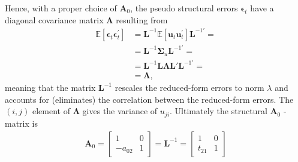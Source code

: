 \documentclass[a4paper,11pt,listof=nochaptergap,oneside,pointednumbers,bibtotoc,bigheadings,liststotoc,hidelinks]{scrbook}
\theoremstyle{mysatz}
\theoremstyle{mydefinition}
\theoremstyle{mytheorem}
\theoremstyle{mybemerkung}
\newcommand{\vect}[1]{\boldsymbol{\mathbf{#1}}}
\begin{document}
Hence, with a proper choice of $\vect{A}_0$, the pseudo structural errors $\vect{\epsilon}_t$ have a diagonal covariance matrix $\vect{\Lambda}$ resulting from 
\begin{equation} \label{eq:svar22}
\begin{split}
	\mathbb{E}[\vect{\epsilon}_t\vect{\epsilon}_t^'] & = \vect{L}^{-1} \mathbb{E}[\vect{u}_t\vect{u}_t^']\vect{L}^{-1'} = \\
										& = \vect{L}^{-1} \vect{\Sigma}_u \vect{L}^{-1'} = \\
										& = \vect{L}^{-1} \vect{L \Lambda L}' \vect{L}^{-1'} = \\
										& = \vect{\Lambda},
\end{split}								
\end{equation}
meaning that the matrix $\vect{L}^{-1}$ rescales the reduced-form errors to norm $\lambda$ and accounts for (eliminates) the correlation between the reduced-form errors. The $(i, j)$ element of $\vect{\Lambda}$ gives the variance of $u_{ji}$. Ultimately the structural $\vect{A}_0$ - matrix is \citep{zivot:00}
\begin{equation} \label{eq:svar23}
\begin{split}
	\vect{A}_0 = \begin{bmatrix}
    					1 & 0 \\
					-a_{02} & 1
 					\end{bmatrix} = 
					\vect{L}^{-1} = 
						\begin{bmatrix}
    						1 & 0 \\
						t_{21} & 1
 						\end{bmatrix}
\end{split}								
\end{equation}
\end{document}
